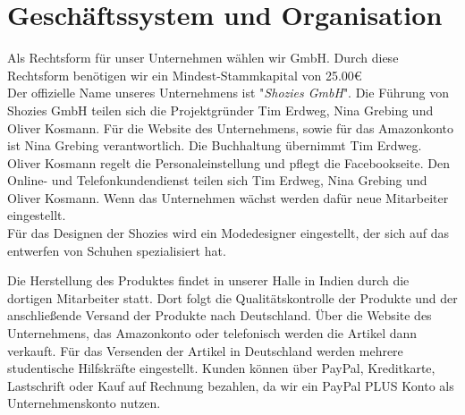\chapter{Geschäftssystem und Organisation}
\label{cha:5}
Als Rechtsform für unser Unternehmen wählen wir GmbH. Durch diese Rechtsform benötigen wir ein Mindest-Stammkapital von 25.00€\\
Der offizielle Name unseres Unternehmens ist "\textit{Shozies GmbH}".
Die Führung von Shozies GmbH teilen sich die Projektgründer Tim Erdweg, Nina Grebing und Oliver Kosmann. Für die Website des Unternehmens, sowie für das Amazonkonto ist Nina Grebing verantwortlich. Die Buchhaltung übernimmt Tim Erdweg. Oliver Kosmann regelt die Personaleinstellung und pflegt die Facebookseite. Den Online- und Telefonkundendienst teilen sich Tim Erdweg, Nina Grebing und Oliver Kosmann. Wenn das Unternehmen wächst werden dafür neue Mitarbeiter eingestellt.\\
Für das Designen der Shozies wird ein Modedesigner eingestellt, der sich auf das entwerfen von Schuhen spezialisiert hat.

Die Herstellung des Produktes findet in unserer Halle in Indien durch die dortigen Mitarbeiter statt. Dort folgt die Qualitätskontrolle der Produkte und der anschließende Versand der Produkte nach Deutschland. Über die Website des Unternehmens, das Amazonkonto oder telefonisch werden die Artikel dann verkauft.
Für das Versenden der Artikel in Deutschland werden mehrere studentische Hilfskräfte eingestellt.
Kunden können über PayPal, Kreditkarte, Lastschrift oder Kauf auf Rechnung bezahlen, da wir ein PayPal PLUS Konto als Unternehmenskonto nutzen.


